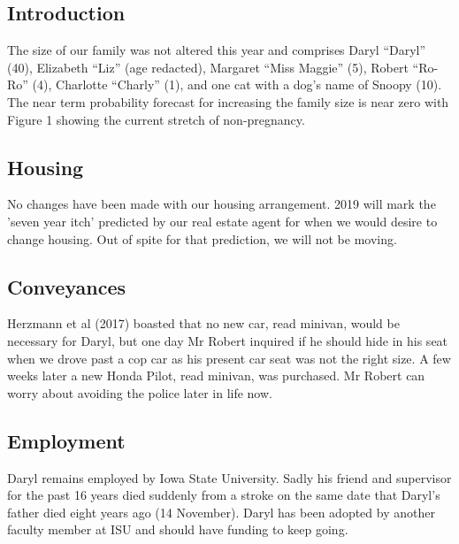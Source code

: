 \documentclass[letterpaper,11pt]{article}
\begin{document}
\begin{multicols}{2}

\section{Introduction} 

The size of our family was not altered this year and comprises Daryl
\enquote{Daryl} (40), Elizabeth \enquote{Liz} (age redacted),
Margaret \enquote{Miss Maggie} (5), Robert \enquote{Ro-Ro} (4), Charlotte
 \enquote{Charly} (1), and one cat with a dog's name of Snoopy (10).  The near
 term probability forecast for increasing the family size is near zero with
 Figure 1 showing the current stretch of non-pregnancy.  

\subsection{Housing}

No changes have been made with our housing arrangement. 2019 will mark the
'seven year itch' predicted by our real estate agent for when we would desire
to change housing. Out of spite for that prediction, we will not be moving.

\subsection{Conveyances}

Herzmann et al (2017) boasted that no new car, read minivan, would be necessary
for Daryl, but one day Mr Robert inquired if he should hide in his seat when
we drove past a cop car as his present car seat was not the right size. A few
weeks later a new Honda Pilot, read minivan, was purchased.  Mr Robert can
worry about avoiding the police later in life now.

\subsection{Employment}
Daryl remains employed by Iowa State University. Sadly his friend and supervisor
for the past 16 years died suddenly from a stroke on the same date that Daryl's
father died eight years ago (14 November). Daryl has been adopted by another
faculty member at ISU and should have funding to keep going.


\end{multicols}
\end{document}
